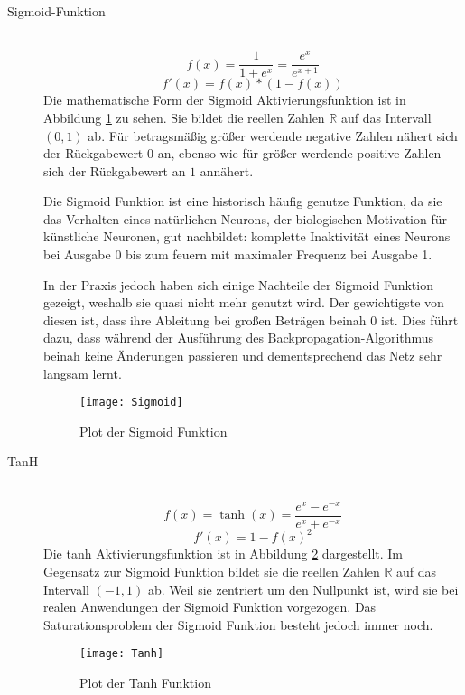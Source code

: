 \begin{description}
	\item[Sigmoid-Funktion] \hfill \\
		\begin{equation}
			f(x) = \frac{1}{1 + e^x} = \frac{e^x}{e^{x + 1}}
			\label{func:Sigmoid}
		\end{equation}
		\begin{equation}
			f'(x) = f(x) * (1 - f(x))
		\end{equation}
		Die mathematische Form der Sigmoid Aktivierungsfunktion ist in Abbildung \ref{sigmoidFunc} zu sehen.
		Sie bildet die reellen Zahlen $\mathbb{R}$ auf das Intervall $(0,1)$ ab. 
		Für betragsmäßig größer werdende negative Zahlen nähert sich der Rückgabewert $0$ an,
		ebenso wie für größer werdende positive Zahlen sich der Rückgabewert an $1$ annähert.

		Die Sigmoid Funktion ist eine historisch häufig genutze Funktion, da sie das Verhalten eines natürlichen Neurons,
		der biologischen Motivation für künstliche Neuronen, gut nachbildet:
		komplette Inaktivität eines Neurons bei Ausgabe 0 bis zum feuern mit maximaler Frequenz bei Ausgabe 1.

		In der Praxis jedoch haben sich einige Nachteile der Sigmoid Funktion gezeigt, weshalb sie quasi nicht mehr genutzt wird.
		Der gewichtigste von diesen ist, dass ihre Ableitung bei großen Beträgen beinah $0$ ist.
		Dies führt dazu, dass während der Ausführung des Backpropagation-Algorithmus beinah keine Änderungen passieren und dementsprechend das Netz sehr langsam lernt.
		
		\begin{figure}
			\centering
			\texttt{[image: Sigmoid]}
			\caption{Plot der Sigmoid Funktion}
			\label{sigmoidFunc}
		\end{figure}
		  


	\item[TanH] \hfill \\
		\begin{equation}
			f(x) = \tanh(x) = \frac{e^x - e^{-x}}{e^x + e^{-x}}
		\end{equation}
		\begin{equation}
			f'(x) = 1 - f(x)^2
		\end{equation}
		Die tanh Aktivierungsfunktion ist in Abbildung \ref{tanhfunction} dargestellt.
		Im Gegensatz zur Sigmoid Funktion bildet sie die reellen Zahlen $\mathbb{R}$ auf das Intervall $(-1, 1)$ ab.
		Weil sie zentriert um den Nullpunkt ist, wird sie bei realen Anwendungen der Sigmoid Funktion vorgezogen.
		Das Saturationsproblem der Sigmoid Funktion besteht jedoch immer noch.
		\begin{figure}
			\centering
			\texttt{[image: Tanh]}
			\caption{Plot der Tanh Funktion}
			\label{tanhfunction}
		\end{figure}
	

\end{description}
